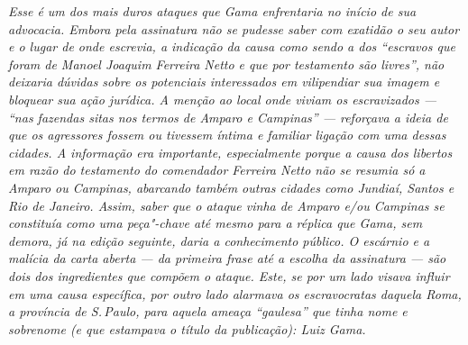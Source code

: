 \begin{flushleft}
{\footnotesize\itshape
Esse é um dos mais duros ataques que Gama enfrentaria no início de
sua advocacia. Embora pela assinatura não se pudesse saber com exatidão
o seu autor e o lugar de onde escrevia, a indicação da causa como sendo
a dos ``escravos que foram de Manoel Joaquim Ferreira Netto e que por
testamento são livres'', não deixaria dúvidas sobre os potenciais
interessados em vilipendiar sua imagem e bloquear sua ação jurídica. A
menção ao local onde viviam os escravizados --- ``nas fazendas sitas nos
termos de Amparo e Campinas'' --- reforçava a ideia de que os agressores
fossem ou tivessem íntima e familiar ligação com uma dessas cidades. A
informação era importante, especialmente porque a causa dos libertos em
razão do testamento do comendador Ferreira Netto não se resumia só a
Amparo ou Campinas, abarcando também outras cidades como Jundiaí, Santos
e Rio de Janeiro. Assim, saber que o ataque vinha de Amparo e/ou
Campinas se constituía como uma peça"-chave até mesmo para a réplica que
Gama, sem demora, já na edição seguinte, daria a conhecimento público. O
escárnio e a malícia da carta aberta --- da primeira frase até a escolha
da assinatura --- são dois dos ingredientes que compõem o ataque. Este,
se por um lado visava influir em uma causa específica,
por outro lado alarmava os escravocratas daquela Roma, a província de S.\,Paulo, para
aquela ameaça ``gaulesa'' que tinha nome e sobrenome (e que estampava o
título da publicação): Luiz Gama.}
\end{flushleft}

